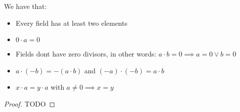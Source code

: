 \begin{framed}
\begin{lemma} We have that:
    \begin{itemize}[itemsep=3pt, topsep=3pt]
        \item Every field has at least two elements
        \item $0\cdot a = 0$
        \item Fields dont have zero divisors, in other words: $a\cdot b= 0 \implies a=0 \vee b=0$
        \item $a\cdot (-b) = -(a\cdot b)$ and $(-a)\cdot (-b) = a\cdot b$
        \item $x\cdot a = y\cdot a $ with $a\neq 0 \implies x=y$
    \end{itemize}
\end{lemma}
\end{framed}
\begin{proof}
    TODO
\end{proof}